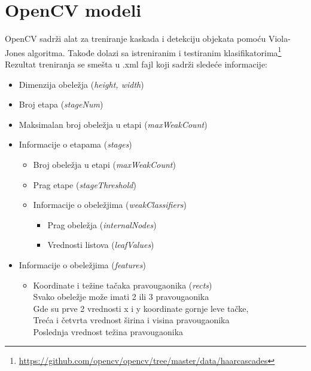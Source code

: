 \section{OpenCV modeli} \label{opencv_model}

OpenCV sadrži alat za treniranje kaskada i detekciju objekata pomoću
Viola-Jones algoritma.
Takođe dolazi sa istreniranim i testiranim
klasifikatorima\footnote{\url{https://github.com/opencv/opencv/tree/master/data/haarcascades}}
\cite{OpenCV_docs} \\

\noindent
Rezultat treniranja se smešta u .xml fajl koji sadrži sledeće informacije:

\begin{itemize}
	\item Dimenzija obeležja (\emph{height, width})
	\item Broj etapa (\emph{stageNum})
	\item Maksimalan broj obeležja u etapi (\emph{maxWeakCount})
	\item Informacije o etapama (\emph{stages})
    \begin{itemize}
    \item Broj obeležja u etapi (\emph{maxWeakCount})
    \item Prag etape (\emph{stageThreshold})
    \item Informacije o obeležjima (\emph{weakClassifiers})
      \begin{itemize}
      \item Prag obeležja (\emph{internalNodes})
      \item Vrednosti listova (\emph{leafValues})
      \end{itemize}
    \end{itemize}
	\item Informacije o obeležjima (\emph{features})
    \begin{itemize}
    \item Koordinate i težine tačaka pravougaonika (\emph{rects}) \\
      Svako obeležje može imati 2 ili 3 pravougaonika \\
      Gde su prve 2 vrednosti x i y koordinate gornje leve tačke, \\
      Treća i četvrta vrednost širina i visina pravougaonika  \\
      Poslednja vrednost težina pravougaonika
    \end{itemize}
\end{itemize}

